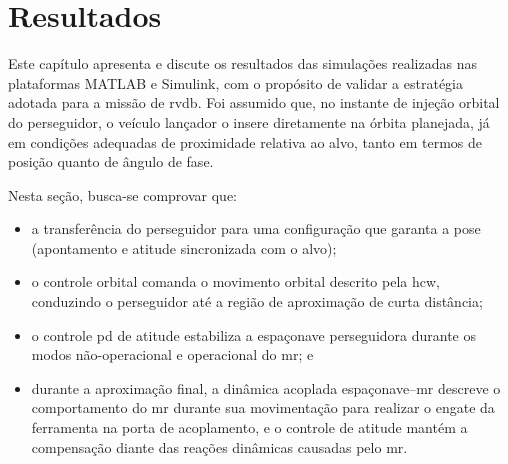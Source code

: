 \chapter{Resultados}
\label{sec_resultados}

Este capítulo apresenta e discute os resultados das simulações realizadas nas plataformas MATLAB e Simulink, com o propósito de validar a estratégia adotada para a missão de \gls{rvdb}.
Foi assumido que, no instante de injeção orbital do perseguidor, o veículo lançador o insere diretamente na órbita planejada, já em condições adequadas de proximidade relativa ao alvo, tanto em termos de posição quanto de ângulo de fase.


Nesta seção, busca-se comprovar que:
\begin{itemize}
  \item a transferência do perseguidor para uma configuração que garanta a pose (apontamento e atitude sincronizada com o alvo);
  \item o controle orbital comanda o movimento orbital descrito pela \gls{hcw}, conduzindo o perseguidor até a região de aproximação de curta distância;
  \item o controle \gls{pd} de atitude estabiliza a espaçonave perseguidora durante os modos não-operacional e operacional do \gls{mr}; e
  \item durante a aproximação final, a dinâmica acoplada espaçonave--\gls{mr} descreve o comportamento do \gls{mr} durante sua movimentação para realizar o engate da ferramenta na porta de acoplamento, e o controle de atitude mantém a compensação diante das reações dinâmicas causadas pelo \gls{mr}.
\end{itemize}








